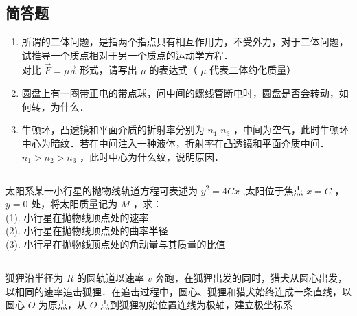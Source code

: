 \subsection{简答题}

\begin{enumerate}

\item 所谓的二体问题，是指两个指点只有相互作用力，不受外力，对于二体问题，试推导一个质点相对于另一个质点的运动学方程．\\
对比 $\vec{F} = \mu \vec{a}$ 形式，请写出 $\mu$ 的表达式（ $\mu$ 代表二体约化质量）

\item 圆盘上有一圈带正电的带点球，问中间的螺线管断电时，圆盘是否会转动，如何转，为什么．

\item 牛顿环，凸透镜和平面介质的折射率分别为 $n_{1}$ $n_{3}$ ，中间为空气，此时牛顿环中心为暗纹．若在中间注入一种液体，折射率在凸透镜和平面介质中间．$n_{1}>n_{2}>n_{3}$ ，此时中心为什么纹，说明原因．

\end{enumerate}

\subsection{ }
太阳系某一小行星的抛物线轨道方程可表述为 $y^{2} = 4Cx$ ,太阳位于焦点 $x = C$ ，$y = 0$ 处，将太阳质量记为 $M$ ，求：\\
(1). 小行星在抛物线顶点处的速率\\
(2). 小行星在抛物线顶点处的曲率半径\\
(3). 小行星在抛物线顶点处的角动量与其质量的比值\\

\subsection{ }
狐狸沿半径为 $R$ 的圆轨道以速率 $v$ 奔跑，在狐狸出发的同时，猎犬从圆心出发，以相同的速率追击狐狸．在追击过程中，圆心、狐狸和猎犬始终连成一条直线，以圆心 $O$ 为原点，从 $O$ 点到狐狸初始位置连线为极轴，建立极坐标系